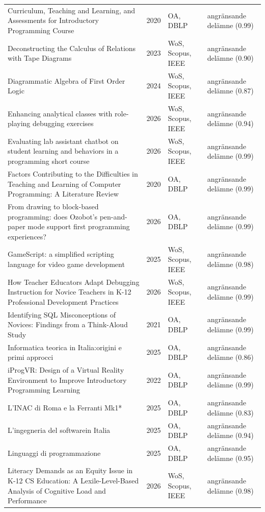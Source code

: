 \begin{longtable}{@{}%
  >{\raggedright\arraybackslash}p{}c%
  >{\raggedright\arraybackslash}p{}%
  >{\raggedright\arraybackslash}p{}@{}}
Curriculum, Teaching and Learning, and Assessments for Introductory Programming Course & 2020 & OA, DBLP & angränsande delämne (0.99) \\
Deconstructing the Calculus of Relations with Tape Diagrams & 2023 & WoS, Scopus, IEEE & angränsande delämne (0.90) \\
Diagrammatic Algebra of First Order Logic & 2024 & WoS, Scopus, IEEE & angränsande delämne (0.87) \\
Enhancing analytical classes with role-playing debugging exercises & 2026 & WoS, Scopus, IEEE & angränsande delämne (0.94) \\
Evaluating lab assistant chatbot on student learning and behaviors in a programming short course & 2026 & WoS, Scopus, IEEE & angränsande delämne (0.99) \\
Factors Contributing to the Difficulties in Teaching and Learning of Computer Programming: A Literature Review & 2020 & OA, DBLP & angränsande delämne (0.99) \\
From drawing to block-based programming: does Ozobot's pen-and-paper mode support first programming experiences? & 2026 & OA, DBLP & angränsande delämne (0.99) \\
GameScript: a simplified scripting language for video game development & 2025 & WoS, Scopus, IEEE & angränsande delämne (0.98) \\
How Teacher Educators Adapt Debugging Instruction for Novice Teachers in K-12 Professional Development Practices & 2026 & WoS, Scopus, IEEE & angränsande delämne (0.99) \\
Identifying SQL Misconceptions of Novices: Findings from a Think-Aloud Study & 2021 & OA, DBLP & angränsande delämne (0.99) \\
Informatica teorica in Italia:origini e primi approcci & 2025 & OA, DBLP & angränsande delämne (0.86) \\
iProgVR: Design of a Virtual Reality Environment to Improve Introductory Programming Learning & 2022 & OA, DBLP & angränsande delämne (0.99) \\
L'INAC di Roma e la Ferranti Mk1* & 2025 & OA, DBLP & angränsande delämne (0.83) \\
L'ingegneria del softwarein Italia & 2025 & OA, DBLP & angränsande delämne (0.94) \\
Linguaggi di programmazione & 2025 & OA, DBLP & angränsande delämne (0.95) \\
Literacy Demands as an Equity Issue in K-12 CS Education: A Lexile-Level-Based Analysis of Cognitive Load and Performance & 2026 & WoS, Scopus, IEEE & angränsande delämne (0.98) \\

\end{longtable}

